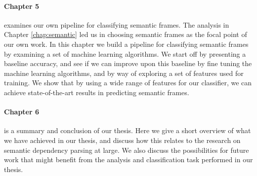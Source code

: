 \paragraph{Chapter 5} examines our own pipeline for classifying semantic frames. The analysis in Chapter \ref{chap:semantic} led us in choosing semantic frames as the focal point of our own work. In this chapter we build a pipeline for classifying semantic frames by examining a set of machine learning algorithms. We start off by presenting a baseline accuracy, and see if we can improve upon this baseline by fine tuning the machine learning algorithms, and by way of exploring a set of features used for training. We show that by using a wide range of features for our classifier, we can achieve state-of-the-art results in predicting semantic frames.

\paragraph{Chapter 6} is a summary and conclusion of our thesis. Here we give a short overview of what we have achieved in our thesis, and discuss how this relates to the research on semantic dependency parsing at large. We also discuss the possibilities for future work that might benefit from the analysis and classification task performed in our thesis.